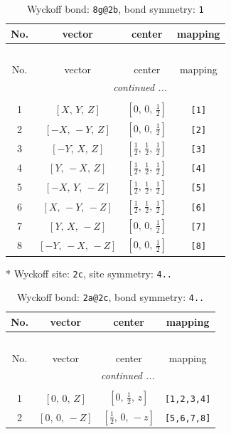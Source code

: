 \documentclass[fleqn,8pt]{jsarticle}
\begin{document}
\begin{longtable}{cccc}
\caption{Wyckoff bond: {\tt 8g@2b}, bond symmetry: {\tt 1}}
 \\
 \hline \hline
No. & vector & center & mapping \\ \hline \endfirsthead

\multicolumn{3}{l}{\tablename\ \thetable{}} \\
 \hline \hline
No. & vector & center & mapping \\ \hline \endhead

 \hline \hline
\multicolumn{3}{r}{\footnotesize\it continued ...} \\ \endfoot

 \hline \hline
\multicolumn{3}{r}{} \\ \endlastfoot

1 & $\left[ X,\, Y,\, Z \right]$ & $\left[ 0,\, 0,\, \frac{1}{2} \right]$ & {\tt [1]} \\ \hline
2 & $\left[ - X,\, - Y,\, Z \right]$ & $\left[ 0,\, 0,\, \frac{1}{2} \right]$ & {\tt [2]} \\ \hline
3 & $\left[ - Y,\, X,\, Z \right]$ & $\left[ \frac{1}{2},\, \frac{1}{2},\, \frac{1}{2} \right]$ & {\tt [3]} \\ \hline
4 & $\left[ Y,\, - X,\, Z \right]$ & $\left[ \frac{1}{2},\, \frac{1}{2},\, \frac{1}{2} \right]$ & {\tt [4]} \\ \hline
5 & $\left[ - X,\, Y,\, - Z \right]$ & $\left[ \frac{1}{2},\, \frac{1}{2},\, \frac{1}{2} \right]$ & {\tt [5]} \\ \hline
6 & $\left[ X,\, - Y,\, - Z \right]$ & $\left[ \frac{1}{2},\, \frac{1}{2},\, \frac{1}{2} \right]$ & {\tt [6]} \\ \hline
7 & $\left[ Y,\, X,\, - Z \right]$ & $\left[ 0,\, 0,\, \frac{1}{2} \right]$ & {\tt [7]} \\ \hline
8 & $\left[ - Y,\, - X,\, - Z \right]$ & $\left[ 0,\, 0,\, \frac{1}{2} \right]$ & {\tt [8]} \\
\end{longtable}
* Wyckoff site: {\tt 2c}, site symmetry: {\tt 4..}
\renewcommand{\arraystretch}{1.2}
\begin{longtable}{cccc}
\caption{Wyckoff bond: {\tt 2a@2c}, bond symmetry: {\tt 4..}}
 \\
 \hline \hline
No. & vector & center & mapping \\ \hline \endfirsthead

\multicolumn{3}{l}{\tablename\ \thetable{}} \\
 \hline \hline
No. & vector & center & mapping \\ \hline \endhead

 \hline \hline
\multicolumn{3}{r}{\footnotesize\it continued ...} \\ \endfoot

 \hline \hline
\multicolumn{3}{r}{} \\ \endlastfoot

1 & $\left[ 0,\, 0,\, Z \right]$ & $\left[ 0,\, \frac{1}{2},\, z \right]$ & {\tt [1,2,3,4]} \\ \hline
2 & $\left[ 0,\, 0,\, - Z \right]$ & $\left[ \frac{1}{2},\, 0,\, - z \right]$ & {\tt [5,6,7,8]} \\
\end{longtable}
\end{document}
